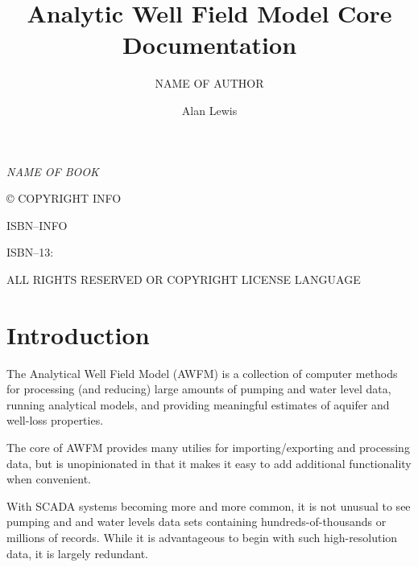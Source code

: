 \documentclass[10pt,twoside,openright]{memoir}
\author{NAME OF AUTHOR}
\author{Alan Lewis}
\title{Analytic Well Field Model Core Documentation}
\date{}
\makeatletter
\def\maketitle{%
  \null
  \thispagestyle{empty}%
  \vfill
  \begin{center}\leavevmode
    \normalfont
    {\LARGE\raggedleft \@author\par}%
    \hrulefill\par
    {\huge\raggedright \@title\par}%
    \vskip 1cm
  \end{center}%
  \vfill
  \null
  \cleardoublepage
  }
\makeatother
\begin{document}
\let\cleardoublepage\clearpage


\maketitle

\frontmatter

\null\vfill

\begin{flushleft}
\textit{NAME OF BOOK}


© COPYRIGHT INFO


ISBN--INFO

ISBN--13: 
\bigskip


ALL RIGHTS RESERVED OR COPYRIGHT LICENSE LANGUAGE

\pagestyle{headings}

\clearpage
\tableofcontents
\clearpage
\listoffigures
\clearpage
\listoftables


\end{flushleft}
\let\cleardoublepage\clearpage

\mainmatter
\sloppy


\chapter*{Introduction} %

The Analytical Well Field Model (AWFM) is a collection of computer methods for processing
(and reducing) large amounts of pumping and water level data, running analytical models,
and providing meaningful estimates of aquifer and well-loss properties.

The core of AWFM provides many utilies for importing/exporting and processing data, but 
is unopinionated in that it makes it easy to add additional functionality when convenient.

With SCADA systems becoming more and more common, it is not unusual to see pumping and 
and water levels data sets containing hundreds-of-thousands or millions of records. While it is
advantageous to begin with such high-resolution data, it is largely redundant. 

\mainmatter

\end{document}
